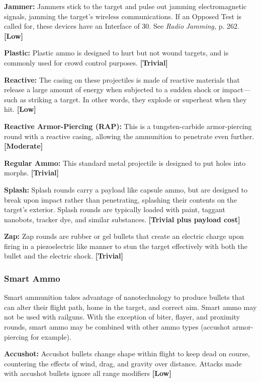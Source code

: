 \textbf{Jammer:} Jammers stick to the target and pulse out 
jamming electromagnetic signals, jamming the target's 
wireless communications. If an Opposed Test is called 
for, these devices have an Interface of 30. See \textit{Radio }
\textit{Jamming,} p. 262. \textbf{[Low]}

\textbf{Plastic: }Plastic ammo is designed to hurt but not 
wound targets, and is commonly used for crowd control
purposes. \textbf{[Trivial]}

\textbf{Reactive: }The casing on these projectiles is made 
of reactive materials that release a large amount of 
energy when subjected to a sudden shock or impact—
such as striking a target. In other words, they explode 
or superheat when they hit. \textbf{[Low]}

\textbf{Reactive Armor-Piercing (RAP):} This is a tungsten-carbide
armor-piercing round with a reactive
casing, allowing the ammunition to penetrate even 
further. \textbf{[Moderate]}

\textbf{Regular Ammo: }This standard metal projectile is 
designed to put holes into morphs. \textbf{[Trivial]}

\textbf{Splash: }Splash rounds carry a payload like capsule 
ammo, but are designed to break upon impact rather 
than penetrating, splashing their contents on the 
target's exterior. Splash rounds are typically loaded 
with paint, taggant nanobots, tracker dye, and similar 
substances. \textbf{[Trivial plus payload cost]}

\textbf{Zap:} Zap rounds are rubber or gel bullets that 
create an electric charge upon firing in a piezoelectric 
like manner to stun the target effectively with both 
the bullet and the electric shock. \textbf{[Trivial]}

\subsubsection{Smart Ammo}

Smart ammunition takes advantage of nanotechnology
to produce bullets that can alter their flight path,
home in the target, and correct aim. Smart ammo may 
not be used with railguns. With the exception of biter, 
flayer, and proximity rounds, smart ammo may be 
combined with other ammo types (accushot armor-piercing
for example).

\textbf{Accushot:} Accushot bullets change shape within 
flight to keep dead on course, countering the effects 
of wind, drag, and gravity over distance. Attacks 
made with accushot bullets ignore all range modifiers
\textbf{[Low]}


